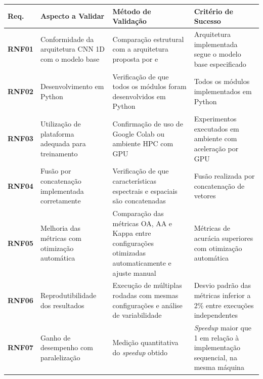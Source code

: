 \begin{quadro}[H]
    \centering
    \caption{Plano de verificação dos requisitos não funcionais}
    \begin{tabular}{|p{}|p{}|p{}|p{}|}
        \hline
        \rowcolor[HTML]{C0C0C0}
        \textbf{Req.} & \textbf{Aspecto a Validar} & \textbf{Método de Validação} & \textbf{Critério de Sucesso} \\
        \hline
        
        \textbf{RNF01} & Conformidade da arquitetura CNN 1D com o modelo base & Comparação estrutural com a arquitetura proposta por \cite{Souza2023} e \cite{Viel10064297} & Arquitetura implementada segue o modelo base especificado \\
        \hline
        
        \textbf{RNF02} & Desenvolvimento em Python & Verificação de que todos os módulos foram desenvolvidos em Python & Todos os módulos implementados em Python \\
        \hline
        
        \textbf{RNF03} & Utilização de plataforma adequada para treinamento & Confirmação de uso de Google Colab ou ambiente HPC com GPU & Experimentos executados em ambiente com aceleração por GPU \\
        \hline
        
        \textbf{RNF04} & Fusão por concatenação implementada corretamente & Verificação de que características espectrais e espaciais são concatenadas & Fusão realizada por concatenação de vetores \\
        \hline
        
        \textbf{RNF05} & Melhoria das métricas com otimização automática & Comparação das métricas OA, AA e Kappa entre configurações otimizadas automaticamente e ajuste manual & Métricas de acurácia superiores com otimização automática \\
        \hline
        
        \textbf{RNF06} & Reprodutibilidade dos resultados & Execução de múltiplas rodadas com mesmas configurações e análise de variabilidade & Desvio padrão das métricas inferior a 2\% entre execuções independentes \\
        \hline
        
        \textbf{RNF07} & Ganho de desempenho com paralelização & Medição quantitativa do \textit{speedup} obtido & \textit{Speedup} maior que 1 em relação à implementação sequencial, na mesma máquina \\
        \hline
    \end{tabular}
    \label{tab:planoVerificacaoRNF}
\end{quadro}

